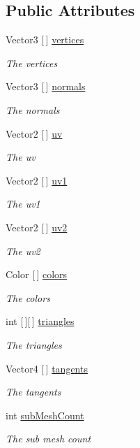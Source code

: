 \subsection*{Public Attributes}
\begin{DoxyCompactItemize}
\item 
Vector3 \mbox{[}$\,$\mbox{]} \hyperlink{class_store_mesh_a189a0d91c5aae63a798faee218866ff4}{vertices}
\begin{DoxyCompactList}\small\item\em The vertices \end{DoxyCompactList}\item 
Vector3 \mbox{[}$\,$\mbox{]} \hyperlink{class_store_mesh_a9b85097b5453301bd45d3e1064027916}{normals}
\begin{DoxyCompactList}\small\item\em The normals \end{DoxyCompactList}\item 
Vector2 \mbox{[}$\,$\mbox{]} \hyperlink{class_store_mesh_a6511706e2179b6a85a9d871ddb62a95f}{uv}
\begin{DoxyCompactList}\small\item\em The uv \end{DoxyCompactList}\item 
Vector2 \mbox{[}$\,$\mbox{]} \hyperlink{class_store_mesh_a4cca669039e64a53c9a70a55704d9afb}{uv1}
\begin{DoxyCompactList}\small\item\em The uv1 \end{DoxyCompactList}\item 
Vector2 \mbox{[}$\,$\mbox{]} \hyperlink{class_store_mesh_a3921a62607d4eedd03aa39a29a9d040c}{uv2}
\begin{DoxyCompactList}\small\item\em The uv2 \end{DoxyCompactList}\item 
Color \mbox{[}$\,$\mbox{]} \hyperlink{class_store_mesh_a1b2a448a6c66bb041162f0a37ee112d5}{colors}
\begin{DoxyCompactList}\small\item\em The colors \end{DoxyCompactList}\item 
int \mbox{[}$\,$\mbox{]}\mbox{[}$\,$\mbox{]} \hyperlink{class_store_mesh_a0ec43c3dd9ca1f815e36ade444497d8d}{triangles}
\begin{DoxyCompactList}\small\item\em The triangles \end{DoxyCompactList}\item 
Vector4 \mbox{[}$\,$\mbox{]} \hyperlink{class_store_mesh_af261f924d969032a763d9e4b0d2b64c4}{tangents}
\begin{DoxyCompactList}\small\item\em The tangents \end{DoxyCompactList}\item 
int \hyperlink{class_store_mesh_a2820704c7a35b398242d69c13b79e47e}{sub\+Mesh\+Count}
\begin{DoxyCompactList}\small\item\em The sub mesh count \end{DoxyCompactList}\end{DoxyCompactItemize}
